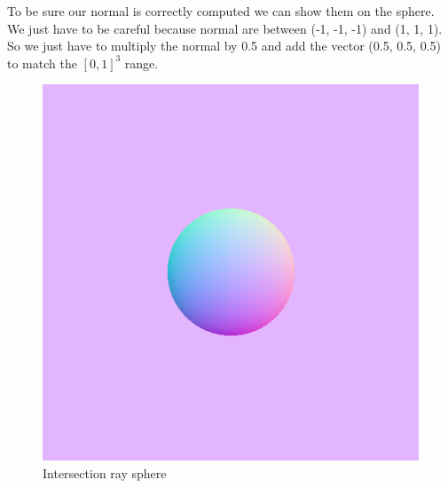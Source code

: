 \documentclass{article}
\begin{document}
To be sure our normal is correctly computed we can show them on the sphere. We just have to be careful because normal are between (-1, -1, -1) and (1, 1, 1). So we just have to multiply the normal by 0.5 and add the vector (0.5, 0.5, 0.5) to match the $[0, 1]^3$ range.
\begin{figure}[h]
	\centering
	\includegraphics[scale=0.6]{figures/intersectnormal.png}
	\caption{Intersection ray sphere}
\end{figure}
\newpage
\end{document}
